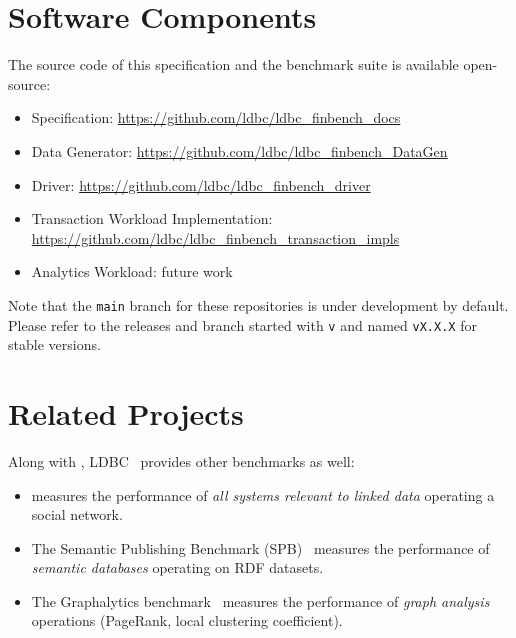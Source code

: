 \section{Software Components}
\label{sec:software-components}

The source code of this specification and the benchmark suite is available
open-source:
\begin{itemize}
      \item \ldbcfinbench Specification: \url{https://github.com/ldbc/ldbc_finbench_docs}
      \item \ldbcfinbench Data Generator: \url{https://github.com/ldbc/ldbc_finbench_DataGen}
      \item \ldbcfinbench Driver: \url{https://github.com/ldbc/ldbc_finbench_driver}
      \item Transaction Workload Implementation: \url{https://github.com/ldbc/ldbc_finbench_transaction_impls}
      \item Analytics Workload: future work
\end{itemize}

Note that the \texttt{main} branch for these repositories is under development
by default. Please refer to the releases and branch started with \texttt{v} and
named \texttt{vX.X.X} for stable versions.


\section{Related Projects}

Along with \ldbcfinbench, LDBC~\cite{DBLP:journals/sigmod/AnglesBLF0ENMKT14}
provides other benchmarks as well:

\begin{itemize}
      \item \ldbcsnb measures the performance of \emph{all systems relevant to
                  linked data} operating a social network.
      \item The Semantic Publishing Benchmark
            (SPB)~\cite{DBLP:conf/semweb/SpasicJP16} measures the performance of
            \emph{semantic databases} operating on RDF datasets.
      \item The Graphalytics
            benchmark~\cite{DBLP:journals/pvldb/IosupHNHPMCCSAT16} measures the
            performance of \emph{graph analysis} operations (\eg PageRank, local
            clustering coefficient).
\end{itemize}